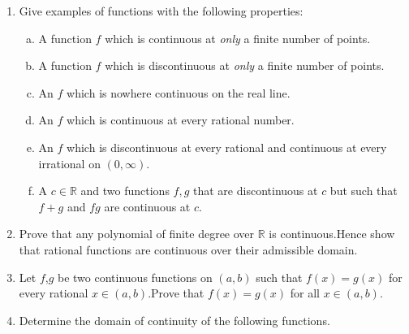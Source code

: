 \documentclass[journal,12pt,onecolumn]{IEEEtran}
\begin{document}
\begin{enumerate}
\begin{enumerate}[(i)]
\begin{multicols}{2}
\end{multicols}
\end{enumerate}

\item Give examples of functions with the following properties:
\setlength\itemsep{2em}
\begin{enumerate}[(a)]

\item A function $f$ which is continuous at \textit{only} a finite number of points.
\item A function $f$ which is discontinuous at \textit{only} a finite number of points.
\item An $f$ which is nowhere continuous on the real line.
\item An $f$ which is continuous at every rational number.
\item An $f$ which is discontinuous at every rational and continuous at every irrational on $(0,\infty)$.
\item A $c \in \mathbb{R}$ and two functions $f, g$ that are discontinuous at $c$ but such that $f+g$ and $fg$ are continuous at $c$.
\end{enumerate}

\item Prove that any polynomial of finite degree over $\mathbb{R}$ is continuous.Hence show that rational functions are continuous over their admissible domain.

\item Let $f$,$g$ be two continuous functions on $(a,b)$ such that $f(x)=g(x)$ for every rational $x\in (a,b)$.Prove that $f(x)=g(x)$ for all $x \in (a,b)$.

\item Determine the domain of continuity of the following functions.

\begin{enumerate}[(i)]
\end{enumerate}
\end{enumerate}
\end{document}
